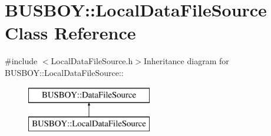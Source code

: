 \hypertarget{classBUSBOY_1_1LocalDataFileSource}{
\section{BUSBOY::LocalDataFileSource Class Reference}
\label{classBUSBOY_1_1LocalDataFileSource}
}


{\ttfamily \#include $<$LocalDataFileSource.h$>$}Inheritance diagram for BUSBOY::LocalDataFileSource::\begin{figure}[H]
\begin{center}
\leavevmode
\includegraphics[height=2cm]{classBUSBOY_1_1LocalDataFileSource}
\end{center}
\end{figure}
